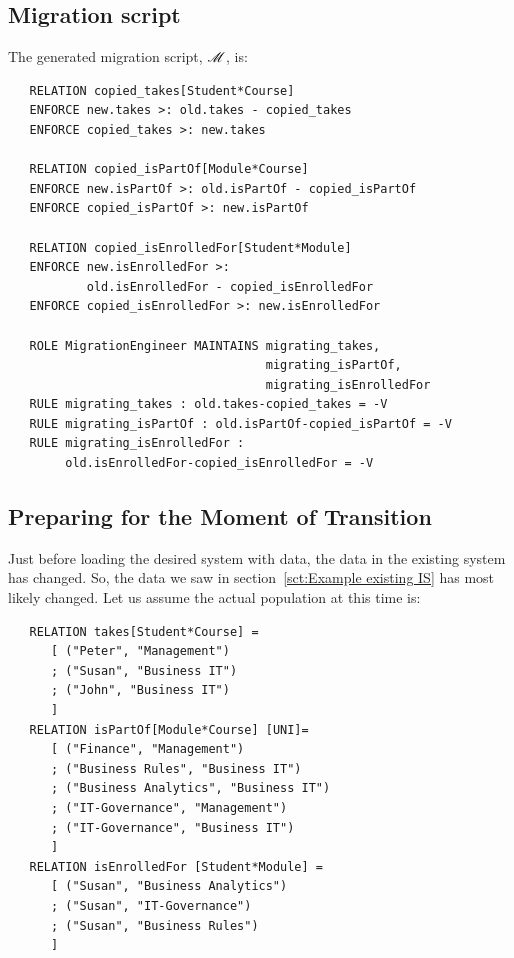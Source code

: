 \documentclass{elsarticle}
\begin{document}
\subsection{Migration script}
   The generated migration script, $\mathscr{M}$, is:
\begin{verbatim}
   RELATION copied_takes[Student*Course]
   ENFORCE new.takes >: old.takes - copied_takes
   ENFORCE copied_takes >: new.takes

   RELATION copied_isPartOf[Module*Course]
   ENFORCE new.isPartOf >: old.isPartOf - copied_isPartOf
   ENFORCE copied_isPartOf >: new.isPartOf

   RELATION copied_isEnrolledFor[Student*Module]
   ENFORCE new.isEnrolledFor >:
           old.isEnrolledFor - copied_isEnrolledFor
   ENFORCE copied_isEnrolledFor >: new.isEnrolledFor

   ROLE MigrationEngineer MAINTAINS migrating_takes,
                                    migrating_isPartOf,
                                    migrating_isEnrolledFor
   RULE migrating_takes : old.takes-copied_takes = -V
   RULE migrating_isPartOf : old.isPartOf-copied_isPartOf = -V
   RULE migrating_isEnrolledFor :
        old.isEnrolledFor-copied_isEnrolledFor = -V
\end{verbatim}

\subsection{Preparing for the Moment of Transition}
   Just before loading the desired system with data,
   the data in the existing system has changed.
   So, the data we saw in section~\ref{sct:Example existing IS} has most likely changed.
   Let us assume the actual population at this time is:
\begin{verbatim}
   RELATION takes[Student*Course] =
      [ ("Peter", "Management")
      ; ("Susan", "Business IT")
      ; ("John", "Business IT")
      ]
   RELATION isPartOf[Module*Course] [UNI]=
      [ ("Finance", "Management")
      ; ("Business Rules", "Business IT")
      ; ("Business Analytics", "Business IT")
      ; ("IT-Governance", "Management")
      ; ("IT-Governance", "Business IT")
      ]
   RELATION isEnrolledFor [Student*Module] =
      [ ("Susan", "Business Analytics")
      ; ("Susan", "IT-Governance")
      ; ("Susan", "Business Rules")
      ]
\end{verbatim}
\end{document}
